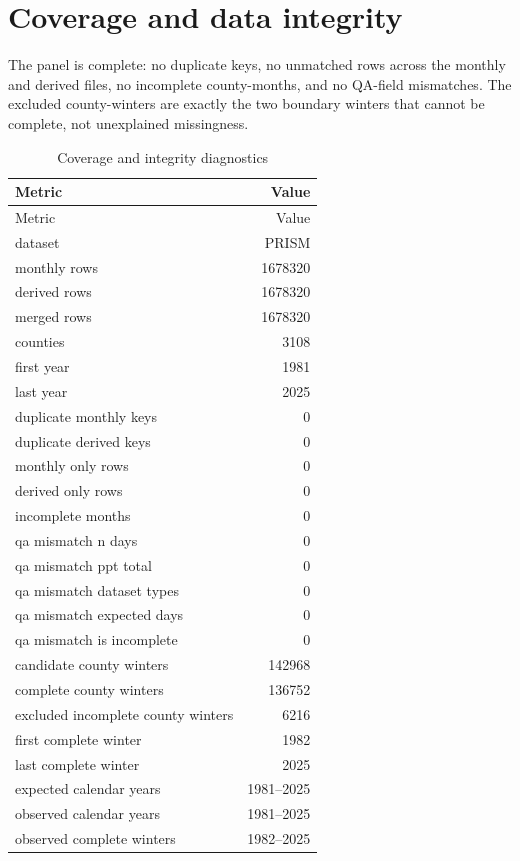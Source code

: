 \documentclass[11pt, english, letterpaper]{article}
\begin{document}
\section{Coverage and data integrity}
The panel is complete: no duplicate keys, no unmatched rows across the monthly
and derived files, no incomplete county-months, and no QA-field mismatches. The
excluded county-winters are exactly the two boundary winters that cannot be
complete, not unexplained missingness.
\par
\begin{longtable}{@{}lr@{}}
\caption{Coverage and integrity diagnostics}\\
\toprule Metric & Value \\ \midrule \endfirsthead
\toprule Metric & Value \\ \midrule \endhead
\bottomrule \endfoot
dataset & PRISM \\
monthly rows & 1678320 \\
derived rows & 1678320 \\
merged rows & 1678320 \\
counties & 3108 \\
first year & 1981 \\
last year & 2025 \\
duplicate monthly keys & 0 \\
duplicate derived keys & 0 \\
monthly only rows & 0 \\
derived only rows & 0 \\
incomplete months & 0 \\
qa mismatch n days & 0 \\
qa mismatch ppt total & 0 \\
qa mismatch dataset types & 0 \\
qa mismatch expected days & 0 \\
qa mismatch is incomplete & 0 \\
candidate county winters & 142968 \\
complete county winters & 136752 \\
excluded incomplete county winters & 6216 \\
first complete winter & 1982 \\
last complete winter & 2025 \\
expected calendar years & 1981–2025 \\
observed calendar years & 1981–2025 \\
observed complete winters & 1982–2025 \\
\end{longtable}
\end{document}
